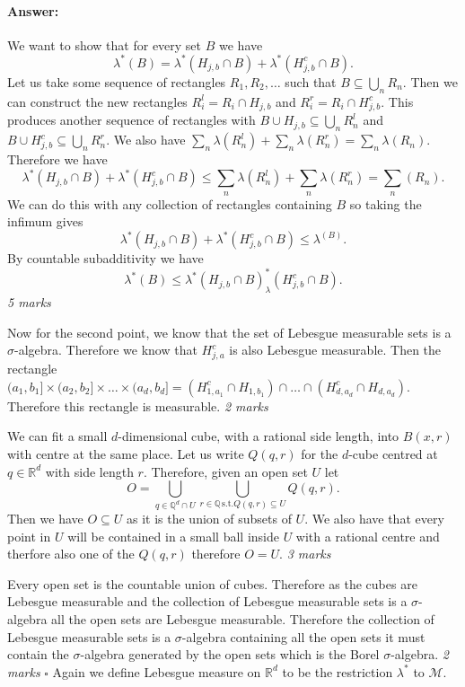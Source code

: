 \documentclass[11pt]{article}
\theoremstyle{definition}
\theoremstyle{remark}
\newenvironment{ans}{\paragraph{Answer:}}{\hfill$\square$}
\begin{document}
\begin{ans}
We want to show that for every set $B$ we have
\[ \lambda^*(B) = \lambda^*(H_{j,b}\cap B) + \lambda^*(H_{j,b}^c \cap B). \] Let us take some sequence of rectangles $R_1, R_2, \dots$ such that $B \subseteq \bigcup_n R_n$. Then we can construct the new rectangles $R^l_i = R_i \cap H_{j,b}$ and $R^r_i = R_i \cap H_{j,b}^c$. This produces another sequence of rectangles with $B \cup H_{j,b} \subseteq \bigcup_n R^l_n$ and $B \cup H_{j,b}^c \subseteq \bigcup_n R^r_n$. We also have $\sum_n \lambda(R^l_n) + \sum_n \lambda(R^r_n) = \sum_n \lambda(R_n)$. Therefore we have
\[ \lambda^*(H_{j,b}\cap B) + \lambda^*(H_{j,b}^c \cap B) \leq \sum_n \lambda(R^l_n) + \sum_n \lambda(R^r_n) = \sum_n(R_n). \] We can do this with any collection of rectangles containing $B$ so taking the infimum gives
\[ \lambda^*(H_{j,b} \cap B) + \lambda^*(H_{j,b}^c \cap B) \leq \lambda^(B). \]
By countable subadditivity we have
\[ \lambda^*(B) \leq \lambda^*(H_{j,b}\cap B) _ \lambda^*(H_{j,b}^c \cap B). \] \emph{5 marks}

Now for the second point, we know that the set of Lebesgue measurable sets is a $\sigma$-algebra. Therefore we know that $H^c_{j,a}$ is also Lebesgue measurable. Then the rectangle $(a_1, b_1] \times (a_2, b_2] \times \dots \times (a_d, b_d] = (H^c_{1,a_1}\cap H_{1,b_1})\cap \dots \cap (H^c_{d,a_d} \cap H_{d, a_d})$. Therefore this rectangle is measurable. \emph{2 marks}

We can fit a small $d$-dimensional cube, with a rational side length, into $B(x,r)$ with centre at the same place. Let us write $Q(q,r)$ for the $d$-cube centred at $q \in \mathbb{R}^d$ with side length $r$. Therefore, given an open set $U$ let 
\[ O = \bigcup_{q \in \mathbb{Q}^d \cap U} \bigcup_{r \in \mathbb{Q} \,\mbox{s.t.} Q(q,r) \subseteq U}Q(q,r). \] Then we have $O \subseteq U$ as it is the union of subsets of $U$. We also have that every point in $U$ will be contained in a small ball inside $U$ with a rational centre and therfore also one of the $Q(q,r)$ therefore $O = U$. \emph{3 marks}

Every open set is the countable union of cubes. Therefore as the cubes are Lebesgue measurable and the collection of Lebesgue measurable sets is a $\sigma$-algebra all the open sets are Lebesgue measurable. Therefore the collection of Lebesgue measurable sets is a $\sigma$-algebra containing all the open sets it must contain the $\sigma$-algebra generated by the open sets which is the Borel $\sigma$-algebra. \emph{2 marks}
\end{ans}
Again we define Lebesgue measure on $\mathbb{R}^d$ to be the restriction $\lambda^*$ to $\mathcal{M}$.
\end{document}
